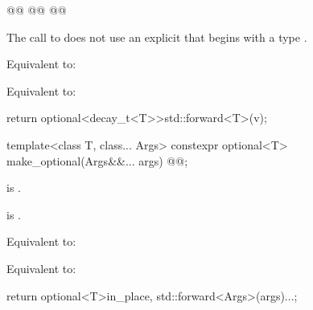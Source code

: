 %
\begin{itemdecl}
@@
@@
  @@
\end{itemdecl}

\begin{itemdescr}
\pnum
\constraints
The call to  does not use an explicit  that begins with a type .

\begin{removedblock}
\pnum
\effects
Equivalent to: 
\end{removedblock}

\begin{addedblock}
\pnum
Equivalent to:
\begin{codeblock}
return optional<decay_t<T>>{std::forward<T>(v)};
\end{codeblock}
\end{addedblock}
\end{itemdescr}

%
\begin{itemdecl}
template<class T, class... Args>
  constexpr optional<T> make_optional(Args&&... args) @@;
\end{itemdecl}

\begin{itemdescr}
\begin{addedblock}
\pnum
\constraints
{} is .
\end{addedblock}

\begin{addedblock}
\pnum
\mandates
{} is .
\end{addedblock}

\begin{removedblock}
\pnum
\effects
Equivalent to: 
\end{removedblock}

\begin{addedblock}
\pnum
Equivalent to:
\begin{codeblock}
return optional<T>{in_place, std::forward<Args>(args)...};
\end{codeblock}
\end{addedblock}
\end{itemdescr}

